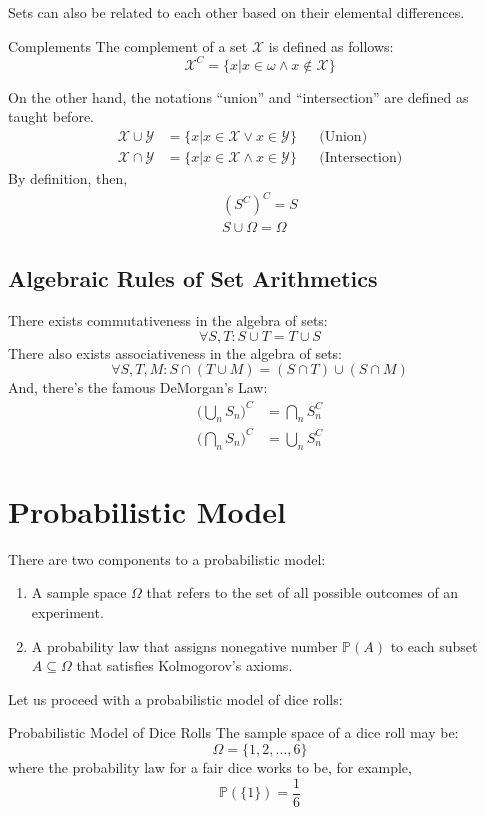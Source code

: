 Sets can also be related to each other based on their elemental differences.
\begin{ln-define}{Complements}{}
    The complement of a set $\mathcal{X}$ is defined as follows:
    \[
        \mathcal{X}^C = \{x | x \in \omega \land x \not \in \mathcal{X} \}
    \]
\end{ln-define}
On the other hand, the notations ``union'' and ``intersection'' are defined as taught before.
\begin{align*}
    \mathcal{X} \cup \mathcal{Y} &= \{x | x \in \mathcal{X} \lor x \in \mathcal{Y}\} &&\text{(Union)}\\
    \mathcal{X} \cap \mathcal{Y} &= \{x | x \in \mathcal{X} \land x \in \mathcal{Y}\} &&\text{(Intersection)}
\end{align*}
By definition, then,
\begin{align*}
    {(S^C)}^C = S \\
    S \cup \Omega = \Omega
\end{align*}

\subsection{Algebraic Rules of Set Arithmetics}
There exists commutativeness in the algebra of sets:
\[
    \forall S, T: S \cup T = T \cup S
\]
There also exists associativeness in the algebra of sets:
\[
    \forall S, T, M: S \cap (T \cup M) = (S \cap T) \cup (S \cap M)
\]
And, there's the famous DeMorgan's Law:
\begin{align*}
    {\big( \bigcup_n S_n \big)}^C &= \bigcap_n S_n^C \\
    {\big( \bigcap_n S_n \big)}^C &= \bigcup_n S_n^C
\end{align*}

\section{Probabilistic Model}
There are two components to a probabilistic model:
\begin{enumerate}
    \item A sample space $\Omega$ that refers to the set of all possible outcomes of an experiment.
    \item A probability law that assigns nonegative number $\mathbb{P}(A)$ to each subset $A \subseteq \Omega$ that satisfies Kolmogorov's axioms.
\end{enumerate}
Let us proceed with a probabilistic model of dice rolls:
\begin{ln-example}{Probabilistic Model of Dice Rolls}{}
    The sample space of a dice roll may be:
    \[
        \Omega = \{1, 2, \dots, 6\}
    \]
    where the probability law for a fair dice works to be, for example,
    \[
        \mathbb{P}(\{1\}) = \frac{1}{6}
    \]
\end{ln-example}

